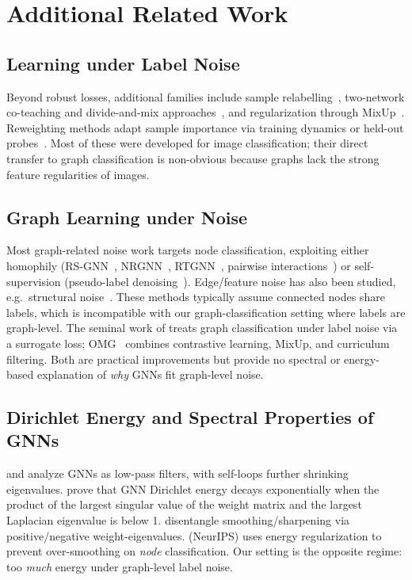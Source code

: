 \section{Additional Related Work}
\label{app:additional_related}

\subsection{Learning under Label Noise}
Beyond robust losses, additional families include sample relabelling~\citep{arazo2019unsupervised, reed2014training}, two-network co-teaching and divide-and-mix approaches~\citep{han2018co, li2020dividemix, kim2023crosssplit}, and regularization through MixUp~\citep{mixup}. Reweighting methods adapt sample importance via training dynamics or held-out probes~\citep{liu2015classification, pleiss2020identifying}. Most of these were developed for image classification; their direct transfer to graph classification is non-obvious because graphs lack the strong feature regularities of images.

\subsection{Graph Learning under Noise}
Most graph-related noise work targets node classification, exploiting either homophily (RS-GNN~\citep{structuralnoise3}, NRGNN~\citep{nrgnn11}, RTGNN~\citep{contrastivelearning5}, pairwise interactions~\citep{pairwiseinteraction4}) or self-supervision (pseudo-label denoising~\citep{ssl8, noisegovernance6}). Edge/feature noise has also been studied, e.g.\ structural noise~\citep{structuralnoise2, structuralnoise3}. These methods typically assume connected nodes share labels, which is incompatible with our graph-classification setting where labels are graph-level. The seminal work of \citet{graphC1} treats graph classification under label noise via a surrogate loss; OMG~\citep{omg7} combines contrastive learning, MixUp, and curriculum filtering. Both are practical improvements but provide no spectral or energy-based explanation of \emph{why} GNNs fit graph-level noise.

\subsection{Dirichlet Energy and Spectral Properties of GNNs}
\citet{nt2019revisiting} and \citet{rusch2023survey} analyze GNNs as low-pass filters, with self-loops further shrinking eigenvalues. \citet{noteonoversmoothing, oversmoothing2} prove that GNN Dirichlet energy decays exponentially when the product of the largest singular value of the weight matrix and the largest Laplacian eigenvalue is below 1. \citet{GRAFF} disentangle smoothing/sharpening via positive/negative weight-eigenvalues. \citet{zhou2021dirichlet} (NeurIPS) uses energy regularization to prevent over-smoothing on \emph{node} classification. Our setting is the opposite regime: too \emph{much} energy under graph-level label noise.

